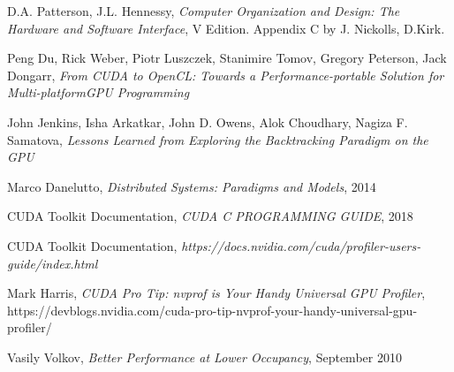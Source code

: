 \documentclass[12pt]{report}
\begin{document}
\renewcommand{\familydefault}{\sfdefault}

\hypersetup {
    colorlinks,
    citecolor= green,
    filecolor= black,
    linkcolor= black,
    urlcolor= black
}

%

	
    
    \tableofcontents
    
    
    
    
    
    
    
    \listoftables
	
	\begin{thebibliography}{9}
		D.A. Patterson, J.L. Hennessy, 
		\textit{Computer Organization and Design: The Hardware and Software Interface}, V Edition. Appendix C by J. Nickolls, D.Kirk.
	
		Peng Du, Rick Weber, Piotr Luszczek, Stanimire Tomov, Gregory Peterson, Jack Dongarr, 
		\textit{From CUDA to OpenCL: Towards a Performance-portable Solution for Multi-platformGPU Programming}
		
		John Jenkins, Isha Arkatkar, John D. Owens, Alok Choudhary, Nagiza F. Samatova, 
		\textit{Lessons Learned from Exploring the Backtracking Paradigm on the GPU}
		
		
		Marco Danelutto,
		\textit{Distributed Systems: Paradigms and Models}, 2014
		
		CUDA Toolkit Documentation, 		
		\textit{CUDA C PROGRAMMING GUIDE}, 2018
		
		CUDA Toolkit Documentation, 
		\textit{https://docs.nvidia.com/cuda/profiler-users-guide/index.html}
		
		Mark Harris, 
		\textit{CUDA Pro Tip: nvprof is Your Handy Universal GPU Profiler}, https://devblogs.nvidia.com/cuda-pro-tip-nvprof-your-handy-universal-gpu-profiler/
		
		Vasily Volkov,
		\textit{Better Performance at Lower Occupancy}, September 2010
		
		
	
	\end{thebibliography}

\end{document}

